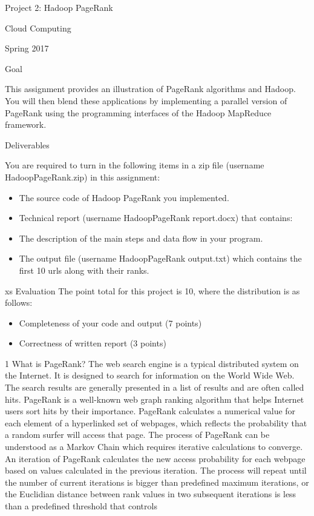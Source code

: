 Project 2: Hadoop PageRank

Cloud Computing

Spring 2017

Goal

This assignment provides an illustration of PageRank algorithms and Hadoop. You will then blend these
applications by implementing a parallel version of PageRank using the programming interfaces of the Hadoop
MapReduce framework.

Deliverables

You are required to turn in the following items in a zip file
(username HadoopPageRank.zip) in this assignment:

\begin{itemize}
\item The source code of Hadoop PageRank you implemented.
\item Technical report (username HadoopPageRank report.docx) that contains:
\item The description of the main steps and data flow in your program.
\item The output file (username HadoopPageRank output.txt) which contains the first 10 urls along with
their ranks.
\end{itemize}
xs
Evaluation
The point total for this project is 10, where the distribution is as follows:
\begin{itemize}
\item Completeness of your code and output (7 points)
\item Correctness of written report (3 points)
\end{itemize}
1 What is PageRank?
The web search engine is a typical distributed system on the Internet. It is designed to search for information
on the World Wide Web. The search results are generally presented in a list of results and are often called
hits. PageRank is a well-known web graph ranking algorithm that helps Internet users sort hits by their
importance.
PageRank calculates a numerical value for each element of a hyperlinked set of webpages, which reflects
the probability that a random surfer will access that page. The process of PageRank can be understood as a
Markov Chain which requires iterative calculations to converge. An iteration of PageRank calculates the new
access probability for each webpage based on values calculated in the previous iteration. The process will
repeat until the number of current iterations is bigger than predefined maximum iterations, or the Euclidian
distance between rank values in two subsequent iterations is less than a predefined threshold that controls
